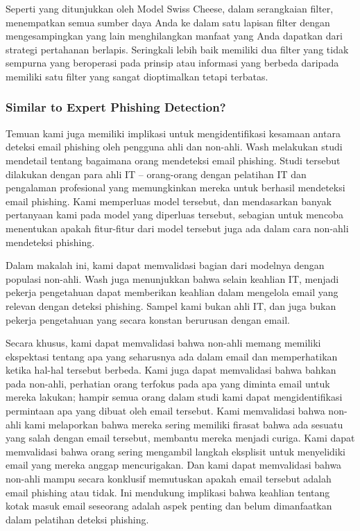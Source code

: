 \documentclass[lettersize,journal]{IEEEtran}
\begin{document}
Seperti yang ditunjukkan oleh Model Swiss Cheese, dalam serangkaian filter,
menempatkan semua sumber daya Anda ke dalam satu lapisan filter dengan
mengesampingkan yang lain menghilangkan manfaat yang Anda dapatkan dari
strategi pertahanan berlapis. Seringkali lebih baik memiliki dua filter yang
tidak sempurna yang beroperasi pada prinsip atau informasi yang berbeda
daripada memiliki satu filter yang sangat dioptimalkan tetapi terbatas.

\subsubsection{Similar to Expert Phishing Detection?}

Temuan kami juga memiliki implikasi untuk mengidentifikasi kesamaan antara
deteksi email phishing oleh pengguna ahli dan non-ahli. Wash \cite{tigaempat}
melakukan studi mendetail tentang bagaimana orang mendeteksi email phishing.
Studi tersebut dilakukan dengan para ahli IT – orang-orang dengan pelatihan IT
dan pengalaman profesional yang memungkinkan mereka untuk berhasil mendeteksi
email phishing. Kami memperluas model tersebut, dan mendasarkan banyak
pertanyaan kami pada model yang diperluas tersebut, sebagian untuk mencoba
menentukan apakah fitur-fitur dari model tersebut juga ada dalam cara non-ahli
mendeteksi phishing.

Dalam makalah ini, kami dapat memvalidasi bagian dari modelnya dengan populasi
non-ahli. Wash juga menunjukkan bahwa selain keahlian IT, menjadi pekerja
pengetahuan dapat memberikan keahlian dalam mengelola email yang relevan dengan
deteksi phishing. Sampel kami bukan ahli IT, dan juga bukan pekerja pengetahuan
yang secara konstan berurusan dengan email.

Secara khusus, kami dapat memvalidasi bahwa non-ahli memang memiliki ekspektasi
tentang apa yang seharusnya ada dalam email dan memperhatikan ketika hal-hal
tersebut berbeda. Kami juga dapat memvalidasi bahwa bahkan pada non-ahli,
perhatian orang terfokus pada apa yang diminta email untuk mereka lakukan;
hampir semua orang dalam studi kami dapat mengidentifikasi permintaan apa yang
dibuat oleh email tersebut. Kami memvalidasi bahwa non-ahli kami melaporkan
bahwa mereka sering memiliki firasat bahwa ada sesuatu yang salah dengan email
tersebut, membantu mereka menjadi curiga. Kami dapat memvalidasi bahwa orang
sering mengambil langkah eksplisit untuk menyelidiki email yang mereka anggap
mencurigakan. Dan kami dapat memvalidasi bahwa non-ahli mampu secara konklusif
memutuskan apakah email tersebut adalah email phishing atau tidak. Ini
mendukung implikasi bahwa keahlian tentang kotak masuk email seseorang adalah
aspek penting dan belum dimanfaatkan dalam pelatihan deteksi phishing.
\end{document}
